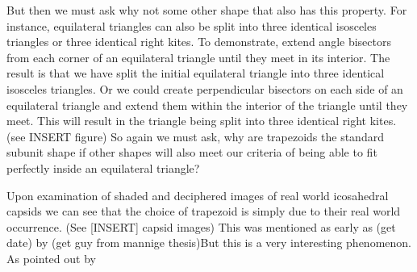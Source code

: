 \documentclass[12pt,letter]{article}
\begin{document}
But then we must ask why not some other shape that also has this property. For instance, equilateral triangles can also be split into three identical isosceles triangles or three identical right kites. To demonstrate, extend angle bisectors from each corner of an equilateral triangle until they meet in its interior. The result is that we have split the initial equilateral triangle into three identical isosceles triangles. Or we could create perpendicular bisectors on each side of an equilateral triangle and extend them within the interior of the triangle until they meet. This will result in the triangle being split into three identical right kites. (see INSERT figure) So again we must ask, why are trapezoids the standard subunit shape if other shapes will also meet our criteria of being able to fit perfectly inside an equilateral triangle?

Upon examination of shaded and deciphered images of real world icosahedral capsids we can see that the choice of trapezoid is simply due to their real world occurrence. (See [INSERT] capsid images) This was mentioned as early as (get date) by (get guy from mannige thesis)But this is a very interesting phenomenon. As pointed out by 





\end{document}
